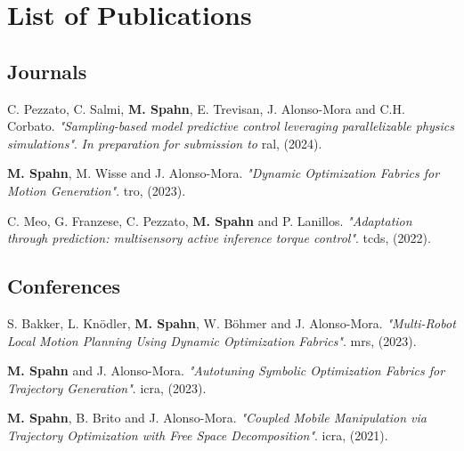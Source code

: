 \chapter*{List of Publications}
\label{publications}


\newcommand{\publication}[4]{#1. {\itshape "#2"}. #3, (#4).}

\section*{Journals}

\begin{etaremune}{\small



\item \publication
  {C. Pezzato, C. Salmi, \textbf{M. Spahn}, E. Trevisan, J.
  Alonso-Mora and C.H. Corbato}
  {Sampling-based model predictive control leveraging parallelizable physics simulations}
  {\textit{In preparation for submission to} \acl{ral}}
  {2024}


\item \publication
  {\textbf{M. Spahn}, M. Wisse and J. Alonso-Mora}
  {Dynamic Optimization Fabrics for Motion Generation}
  {\acl{tro}}
  {2023}

\item \publication
  {C. Meo, G. Franzese, C. Pezzato, \textbf{M. Spahn} and P. Lanillos}
  {Adaptation through prediction: multisensory active inference torque control}
  {\acl{tcds}}
  {2022}


}\end{etaremune}

\section*{Conferences}

\begin{etaremune}{\small
\item \publication{S. Bakker, L. Knödler, \textbf{M. Spahn}, W. Böhmer and J. Alonso-Mora}
  {Multi-Robot Local Motion Planning Using Dynamic
  Optimization Fabrics}
  {\acl{mrs}}
  {2023}

\item \publication
  {\textbf{M. Spahn} and J. Alonso-Mora}
  {Autotuning Symbolic Optimization Fabrics for Trajectory Generation}
  {\acl{icra}}
  {2023}

\item \publication
  {\textbf{M. Spahn}, B. Brito and J. Alonso-Mora}
  {Coupled Mobile Manipulation via Trajectory Optimization with Free Space Decomposition}
  {\acl{icra}}
  {2021}

}\end{etaremune}

